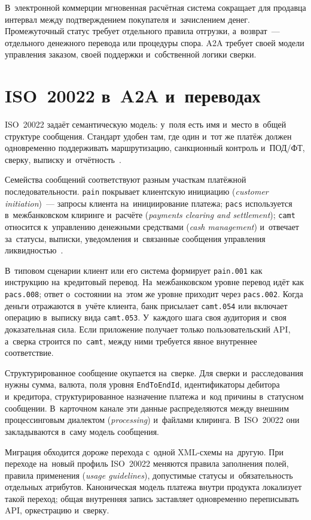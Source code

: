 В~электронной коммерции мгновенная расчётная система сокращает для продавца
интервал между подтверждением покупателя и~зачислением денег. Промежуточный
статус требует отдельного правила отгрузки, а~возврат~--- отдельного денежного
перевода или процедуры спора. A2A требует своей модели управления заказом,
своей поддержки и~собственной логики сверки.

\section{ISO~20022 в~A2A и~переводах}\label{sec:iso20022}

ISO~20022 задаёт семантическую модель: у~поля есть имя и~место в~общей
структуре сообщения. Стандарт удобен там, где один и~тот же платёж должен
одновременно поддерживать маршрутизацию, санкционный контроль и~ПОД/ФТ, сверку,
выписку и~отчётность~\cite{iso-20022}.

Семейства сообщений соответствуют разным участкам платёжной последовательности. \texttt{pain}
покрывает клиентскую инициацию (\textit{customer initiation})~--- запросы
клиента на~инициирование платежа; \texttt{pacs} используется в~межбанковском
клиринге и~расчёте (\textit{payments clearing and settlement}); \texttt{camt}
относится к~управлению денежными средствами (\textit{cash management})
и~отвечает за~статусы, выписки, уведомления и~связанные сообщения управления
ликвидностью~\cite{iso-20022-business-areas}.

В~типовом сценарии клиент или его система формирует \texttt{pain.001} как
инструкцию на~кредитовый перевод. На~межбанковском уровне перевод идёт как
\texttt{pacs.008}; ответ о~состоянии на~этом же уровне приходит через
\texttt{pacs.002}. Когда деньги отражаются в~учёте клиента, банк присылает
\texttt{camt.054} или включает операцию в~выписку вида \texttt{camt.053}.
У~каждого шага своя аудитория и~своя доказательная сила. Если приложение
получает только пользовательский API, а~сверка строится по~\texttt{camt}, между ними
требуется явное внутреннее соответствие.

Структурированное сообщение окупается на~сверке. Для сверки и~расследования
нужны сумма, валюта, поля уровня \texttt{EndToEndId}, идентификаторы дебитора
и~кредитора, структурированное назначение платежа и~код причины в~статусном
сообщении. В~карточном канале эти данные распределяются между внешним
процессинговым диалектом (\textit{processing}) и~файлами клиринга. В~ISO~20022 они
закладываются в~саму модель сообщения.

Миграция обходится дороже перехода с~одной XML-схемы на~другую.
При переходе на~новый профиль ISO~20022 меняются правила заполнения полей,
правила применения (\textit{usage guidelines}), допустимые статусы
и~обязательность отдельных атрибутов. Каноническая модель платежа внутри
продукта локализует такой переход; общая внутренняя запись заставляет
одновременно переписывать API, оркестрацию и~сверку.

